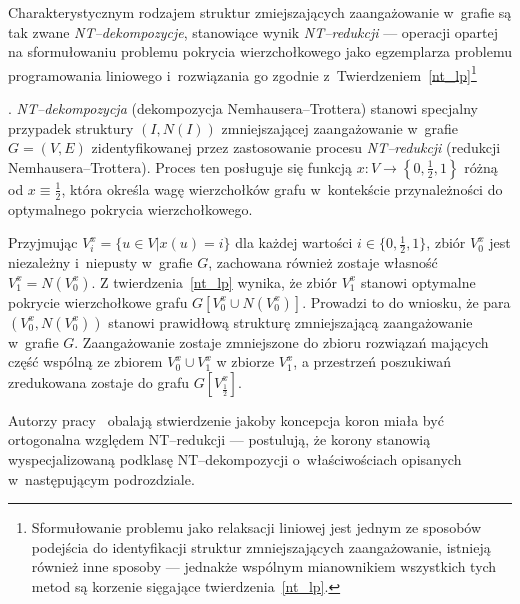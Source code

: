 \par{
  Charakterystycznym rodzajem struktur zmiejszających zaangażowanie w~grafie są tak zwane \emph{NT--dekompozycje}, stanowiące wynik \emph{NT--redukcji} --- operacji opartej na sformułowaniu problemu pokrycia wierzchołkowego jako egzemplarza problemu programowania liniowego i~rozwiązania go zgodnie z~Twierdzeniem~\ref{nt_lp}\footnote{Sformułowanie problemu jako relaksacji liniowej jest jednym ze sposobów podejścia do identyfikacji struktur zmniejszających zaangażowanie, istnieją również inne sposoby --- jednakże wspólnym mianownikiem wszystkich tych metod są korzenie sięgające twierdzenia~\ref{nt_lp}.}
  \begin{definition}.
    \emph{NT--dekompozycja} (dekompozycja Nemhausera--Trottera) stanowi specjalny przypadek struktury $(I, N(I))$ zmniejszającej zaangażowanie w~grafie $G=(V, E)$ zidentyfikowanej przez zastosowanie procesu \emph{NT--redukcji} (redukcji Nemhausera--Trottera).
    Proces ten posługuje się funkcją $x: V \rightarrow \left\{0, \frac{1}{2}, 1\right\}$ różną od $x \equiv \frac{1}{2}$, która określa wagę wierzchołków grafu w~kontekście przynależności do optymalnego pokrycia wierzchołkowego.
  \end{definition}
  Przyjmując $V_i^x=\{u \in V| x(u)=i\}$ dla każdej wartości $i\in \{0, \frac{1}{2}, 1\}$, zbiór $V_0^x$ jest niezależny i~niepusty w~grafie $G$, zachowana również zostaje własność $V_1^x = N(V_0^x)$.
  Z twierdzenia~\ref{nt_lp} wynika, że zbiór $V_1^x$ stanowi optymalne pokrycie wierzchołkowe grafu $G[V_0^x \cup N(V_0^x)]$.
  Prowadzi to do wniosku, że para $(V_0^x, N(V_0^x))$ stanowi prawidłową strukturę zmniejszającą zaangażowanie w~grafie $G$.
  Zaangażowanie zostaje zmniejszone do zbioru rozwiązań mających część wspólną ze zbiorem $V_0^x \cup V_1^x$ w zbiorze $V_1^x$, a przestrzeń poszukiwań zredukowana zostaje do grafu $G[V_\frac{1}{2}^x]$.
}
\par{
  Autorzy pracy~\cite{chlebik:crown} obalają stwierdzenie jakoby koncepcja koron miała być ortogonalna względem NT--redukcji --- postulują, że korony stanowią wyspecjalizowaną podklasę NT--dekompozycji o~właściwościach opisanych w~następującym podrozdziale.
}
